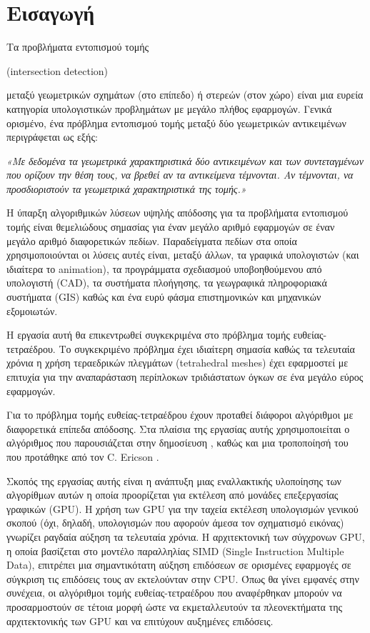 \mainmatter
\chapter{Εισαγωγή}

\noindent Τα προβλήματα εντοπισμού τομής \begin{english}(intersection detection)\end{english} μεταξύ γεωμετρικών σχημάτων (στο επίπεδο) ή στερεών (στον χώρο) είναι μια ευρεία κατηγορία υπολογιστικών προβλημάτων με μεγάλο πλήθος εφαρμογών. Γενικά ορισμένο, ένα πρόβλημα εντοπισμού τομής μεταξύ δύο γεωμετρικών αντικειμένων περιγράφεται ως εξής:

\emph{«Με δεδομένα τα γεωμετρικά χαρακτηριστικά δύο αντικειμένων και των συντεταγμένων που ορίζουν την θέση τους, να βρεθεί
αν τα αντικείμενα τέμνονται. Αν τέμνονται, να προσδιοριστούν τα γεωμετρικά χαρακτηριστικά της τομής.»}

Η ύπαρξη αλγοριθμικών λύσεων υψηλής απόδοσης για τα προβλήματα εντοπισμού τομής είναι θεμελιώδους σημασίας για έναν μεγάλο αριθμό εφαρμογών 
σε έναν μεγάλο αριθμό διαφορετικών πεδίων. Παραδείγματα πεδίων στα οποία χρησιμοποιούνται οι λύσεις αυτές είναι, μεταξύ άλλων, τα γραφικά υπολογιστών (και ιδιαίτερα το animation), τα προγράμματα σχεδιασμού υποβοηθούμενου από υπολογιστή (CAD), τα συστήματα πλοήγησης, τα γεωγραφικά πληροφοριακά συστήματα (GIS) καθώς και ένα ευρύ φάσμα επιστημονικών
και μηχανικών εξομοιωτών.

Η εργασία αυτή θα επικεντρωθεί συγκεκριμένα στο πρόβλημα τομής ευθείας-τετραέδρου. Το συγκεκριμένο  πρόβλημα έχει ιδιαίτερη σημασία καθώς τα τελευταία χρόνια η χρήση τεραεδρικών πλεγμάτων (tetrahedral meshes) έχει εφαρμοστεί με επιτυχία για την αναπαράσταση περίπλοκων τριδιάστατων όγκων σε ένα μεγάλο εύρος εφαρμογών.      

Για το πρόβλημα τομής ευθείας-τετραέδρου έχουν προταθεί διάφοροι αλγόριθμοι με διαφορετικά επίπεδα απόδοσης. Στα πλαίσια της εργασίας αυτής χρησιμοποιείται ο αλγόριθμος που παρουσιάζεται στην δημοσίευση \cite{PlatisTheoharis03}, καθώς και μια τροποποίησή του που προτάθηκε από τον C. Ericson \cite{ericson2005real}\cite{ericson2007blog}.

Σκοπός της εργασίας αυτής είναι η ανάπτυξη μιας εναλλακτικής υλοποίησης των αλγορίθμων αυτών η οποία προορίζεται για εκτέλεση από μονάδες επεξεργασίας γραφικών (GPU). Η χρήση των GPU για την ταχεία εκτέλεση υπολογισμών γενικού σκοπού (όχι, δηλαδή, υπολογισμών που αφορούν άμεσα τον σχηματισμό εικόνας) γνωρίζει ραγδαία αύξηση τα τελευταία χρόνια. Η αρχιτεκτονική των σύγχρονων GPU, η οποία βασίζεται στο μοντέλο παραλληλίας SIMD (Single Instruction Multiple Data), επιτρέπει μια σημαντικότατη αύξηση επιδόσεων σε ορισμένες εφαρμογές σε σύγκριση τις επιδόσεις τους αν εκτελούνταν στην CPU. Όπως θα γίνει εμφανές στην συνέχεια, οι αλγόριθμοι τομής ευθείας-τετραέδρου που αναφέρθηκαν μπορούν να προσαρμοστούν σε τέτοια μορφή ώστε να εκμεταλλευτούν τα πλεονεκτήματα της αρχιτεκτονικής των GPU και να επιτύχουν αυξημένες επιδόσεις.   

